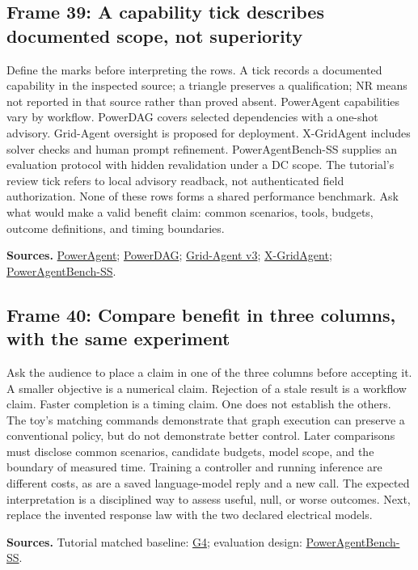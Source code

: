 \documentclass[11pt]{article}
\begin{document}
\subsection*{Frame 39: A capability tick describes documented scope, not superiority}
Define the marks before interpreting the rows. A tick records a documented capability in the inspected source; a triangle preserves a qualification; NR means not reported in that source rather than proved absent. PowerAgent capabilities vary by workflow. PowerDAG covers selected dependencies with a one-shot advisory. Grid-Agent oversight is proposed for deployment. X-GridAgent includes solver checks and human prompt refinement. PowerAgentBench-SS supplies an evaluation protocol with hidden revalidation under a DC scope. The tutorial's review tick refers to local advisory readback, not authenticated field authorization. None of these rows forms a shared performance benchmark. Ask what would make a valid benefit claim: common scenarios, tools, budgets, outcome definitions, and timing boundaries.\par
\par\nopagebreak\begin{minipage}{\linewidth}{\footnotesize\color{slate}\textbf{Sources.} \href{https://poweragent.seas.harvard.edu/}{PowerAgent}; \href{https://arxiv.org/html/2603.17418v1}{PowerDAG}; \href{https://arxiv.org/html/2508.05702v3}{Grid-Agent v3}; \href{https://arxiv.org/html/2512.20789v1}{X-GridAgent}; \href{https://arxiv.org/html/2606.18789v1}{PowerAgentBench-SS}.\par}\end{minipage}\par\medskip
\subsection*{Frame 40: Compare benefit in three columns, with the same experiment}
Ask the audience to place a claim in one of the three columns before accepting it. A smaller objective is a numerical claim. Rejection of a stale result is a workflow claim. Faster completion is a timing claim. One does not establish the others. The toy's matching commands demonstrate that graph execution can preserve a conventional policy, but do not demonstrate better control. Later comparisons must disclose common scenarios, candidate budgets, model scope, and the boundary of measured time. Training a controller and running inference are different costs, as are a saved language-model reply and a new call. The expected interpretation is a disciplined way to assess useful, null, or worse outcomes. Next, replace the invented response law with the two declared electrical models.\par
\par\nopagebreak\begin{minipage}{\linewidth}{\footnotesize\color{slate}\textbf{Sources.} Tutorial matched baseline: \href{../Graph_Workflow_Lab.ipynb}{G4}; evaluation design: \href{https://arxiv.org/html/2606.18789v1}{PowerAgentBench-SS}.\par}\end{minipage}\par\medskip
\end{document}
